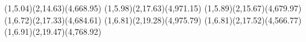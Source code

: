 {(1,5.04)(2,14.63)(4,668.95)}
{(1,5.98)(2,17.63)(4,971.15)}
{(1,5.89)(2,15.67)(4,679.97)}
{(1,6.72)(2,17.33)(4,684.61)}
{(1,6.81)(2,19.28)(4,975.79)}
{(1,6.81)(2,17.52)(4,566.77)}
{(1,6.91)(2,19.47)(4,768.92)}